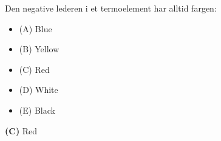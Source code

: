 

Den negative lederen i et termoelement har alltid fargen:

\begin{itemize}
\item{(A)} Blue
\vskip 5pt 
\item{(B)} Yellow
\vskip 5pt 
\item{(C)} Red
\vskip 5pt 
\item{(D)} White
\vskip 5pt 
\item{(E)} Black
\end{itemize}







{\bf (C)} Red
 









